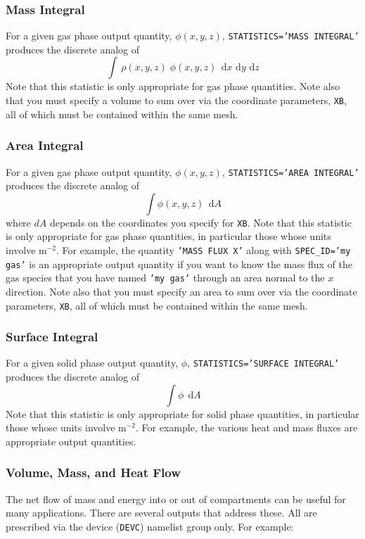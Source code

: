 \documentclass[11pt]{book}
\newcommand{\ct}{\tt\small}
\renewcommand{\d}{\,\mathrm{d}}
\newcommand{\be}{\begin{equation}}
\newcommand{\ee}{\end{equation}}
\begin{document}
\subsubsection{Mass Integral}

For a given gas phase output quantity, $\phi(x,y,z)$, {\ct STATISTICS='MASS INTEGRAL'} produces the discrete analog of
\be \int \, \rho(x,y,z) \; \phi(x,y,z) \; \d x \, \d y \, \d z \ee
Note that this statistic is only appropriate for gas phase quantities. Note also that you must specify a volume to sum over via the
coordinate parameters, {\ct XB}, all of which must be contained within the same mesh.

\subsubsection{Area Integral}

For a given gas phase output quantity, $\phi(x,y,z)$, {\ct STATISTICS='AREA INTEGRAL'} produces the discrete analog of
\be \int \phi(x,y,z) \; \d A \ee
where $dA$ depends on the coordinates you specify for {\ct XB}.
Note that this statistic is only appropriate for gas phase quantities, in particular those whose units involve m$^{-2}$. For example,
the quantity {\ct 'MASS FLUX X'} along with {\ct SPEC\_ID='my gas'} is an appropriate output quantity if you want to know the mass flux of the gas species that
you have named {\ct 'my gas'} through an
area normal to the $x$ direction. Note also that you must specify an area to sum over via the
coordinate parameters, {\ct XB}, all of which must be contained within the same mesh.

\subsubsection{Surface Integral}

For a given solid phase output quantity, $\phi$, {\ct STATISTICS='SURFACE INTEGRAL'} produces the discrete analog of
\be \int \phi \; \d A \ee
Note that this statistic is only appropriate for solid phase quantities, in particular those whose units involve m$^{-2}$. For example, the various heat and mass
fluxes are appropriate output quantities.


\subsubsection{Volume, Mass, and Heat Flow}
\label{info:flows}

The net flow of mass and energy into or out of compartments can be useful for many applications. There are several outputs that address these. All are prescribed via
the device ({\ct DEVC}) namelist group only. For example:
\end{document}
